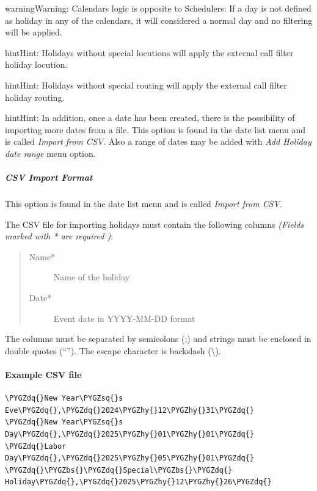 \documentclass[letterpaper,10pt,english]{sphinxmanual}
\def\PYGZbs{\char`\\}
\def\PYGZhy{\char`\-}
\def\PYGZsq{\char`\'}
\def\PYGZdq{\char`\"}
\renewcommand\PYGZsq{\textquotesingle}
\begin{document}
\begin{notice}{warning}{Warning:}
Calendars logic is opposite to Schedulers: If a day is not defined
as holiday in any of the calendars, it will considered a normal day and no
filtering will be applied.
\end{notice}

\begin{notice}{hint}{Hint:}
Holidays without special locutions will apply the external call filter
holiday locution.
\end{notice}

\begin{notice}{hint}{Hint:}
Holidays without special routing will apply the external call filter
holiday routing.
\end{notice}

\begin{notice}{hint}{Hint:}
In addition, once a date has been created, there is the possibility of
importing more dates from a file. This option is found in the date list menu and
is called \emph{Import from CSV}.
Also a range of dates may be added with \emph{Add Holiday date range} menu option.
\end{notice}


\subparagraph{CSV Import Format}
\label{administration_portal/client/vpbx/routing_tools/calendars:csv-import-format}
This option is found in the date list menu and is called \emph{Import from CSV}.

The CSV file for importing holidays must contain the following columns \emph{(Fields marked with * are required
)}:
\begin{quote}
\begin{description}
\item[{Name*}] \leavevmode
Name of the holiday

\item[{Date*}] \leavevmode
Event date in YYYY-MM-DD format

\end{description}
\end{quote}

The columns must be separated by semicolons (;) and strings must be enclosed in double quotes (``''). The escape character is backslash (\textbackslash{}).
\paragraph{Example CSV file}

\begin{Verbatim}[commandchars=\\\{\}]
\PYGZdq{}New Year\PYGZsq{}s Eve\PYGZdq{},\PYGZdq{}2024\PYGZhy{}12\PYGZhy{}31\PYGZdq{}
\PYGZdq{}New Year\PYGZsq{}s Day\PYGZdq{},\PYGZdq{}2025\PYGZhy{}01\PYGZhy{}01\PYGZdq{}
\PYGZdq{}Labor Day\PYGZdq{},\PYGZdq{}2025\PYGZhy{}05\PYGZhy{}01\PYGZdq{}
\PYGZdq{}\PYGZbs{}\PYGZdq{}Special\PYGZbs{}\PYGZdq{} Holiday\PYGZdq{},\PYGZdq{}2025\PYGZhy{}12\PYGZhy{}26\PYGZdq{}
\end{Verbatim}
\end{document}
